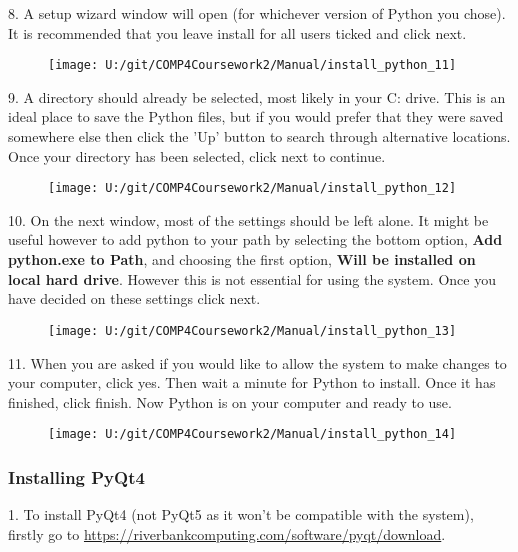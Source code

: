 8. A setup wizard window will open (for whichever version of Python you chose). It is recommended that you leave install for all users ticked and click next.

\begin{figure}[H]
    \texttt{[image: U:/git/COMP4Coursework2/Manual/install\_python\_11]}
\end{figure}

9. A directory should already be selected, most likely in your C: drive. This is an ideal place to save the Python files, but if you would prefer that they were saved somewhere else then click the 'Up' button to search through alternative locations. Once your directory has been selected, click next to continue.

\begin{figure}[H]
    \texttt{[image: U:/git/COMP4Coursework2/Manual/install\_python\_12]}
\end{figure}

10. On the next window, most of the settings should be left alone. It might be useful however to add python to your path by selecting the bottom option, \textbf{Add python.exe to Path}, and choosing the first option, \textbf{Will be installed on local hard drive}. However this is not essential for using the system. Once you have decided on these settings click next.

\begin{figure}[H]
    \texttt{[image: U:/git/COMP4Coursework2/Manual/install\_python\_13]}
\end{figure}

11. When you are asked if you would like to allow the system to make changes to your computer, click yes. Then wait a minute for Python to install. Once it has finished, click finish. Now Python is on your computer and ready to use.

\begin{figure}[H]
    \texttt{[image: U:/git/COMP4Coursework2/Manual/install\_python\_14]}
\end{figure}

\subsubsection{Installing PyQt4}

1. To install PyQt4 (not PyQt5 as it won't be compatible with the system), firstly go to \url{https://riverbankcomputing.com/software/pyqt/download}.

